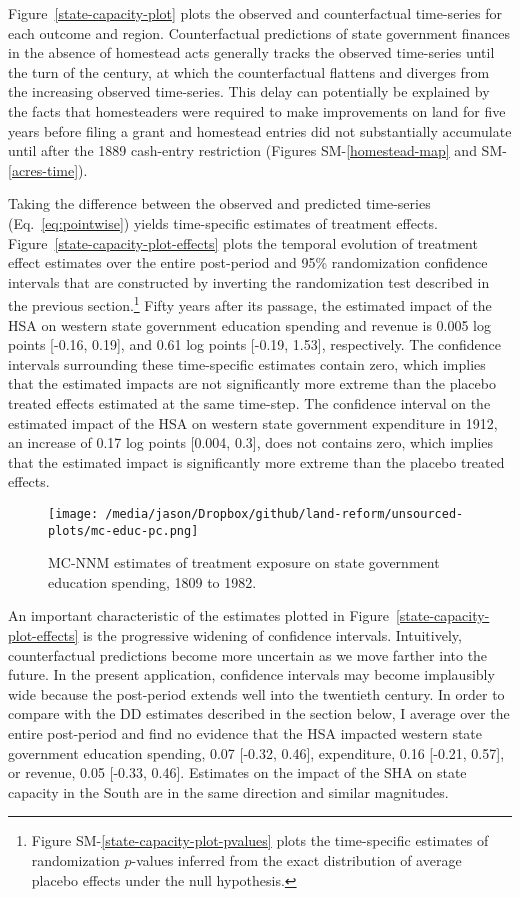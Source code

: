 \documentclass[hidelinks,12pt]{article}
\begin{document}
Figure~\ref{state-capacity-plot} plots the observed and counterfactual time-series for each outcome and region. Counterfactual predictions of state government finances in the absence of homestead acts generally tracks the observed time-series until the turn of the century, at which the counterfactual flattens and diverges from the increasing observed time-series. This delay can potentially be explained by the facts that homesteaders were required to make improvements on land for five years before filing a grant and homestead entries did not substantially accumulate until after the 1889 cash-entry restriction (Figures SM-\ref{homestead-map} and SM-\ref{acres-time}). 

Taking the difference between the observed and predicted time-series (Eq.~\ref{eq:pointwise}) yields time-specific estimates of treatment effects. Figure~\ref{state-capacity-plot-effects} plots the temporal evolution of treatment effect estimates over the entire post-period and 95\% randomization confidence intervals that are constructed by inverting the randomization test described in the previous section.\footnote{Figure SM-\ref{state-capacity-plot-pvalues} plots the time-specific estimates of randomization $p$-values inferred from the exact distribution of average placebo effects under the null hypothesis.} Fifty years after its passage, the estimated impact of the HSA on western state government education spending and revenue is 0.005 log points [-0.16, 0.19], and 0.61 log points [-0.19, 1.53], respectively. The confidence intervals surrounding these time-specific estimates contain zero, which implies that the estimated impacts are not significantly more extreme than the placebo treated effects estimated at the same time-step. The confidence interval on the estimated impact of the HSA on western state government expenditure in 1912, an increase of 0.17 log points [0.004, 0.3], does not contains zero, which implies that the estimated impact is significantly more extreme than the placebo treated effects. 

\begin{figure}[htbp]
	\centering
	\texttt{[image: /media/jason/Dropbox/github/land-reform/unsourced-plots/mc-educ-pc.png]}
	\caption{MC-NNM estimates of treatment exposure on state government education spending, 1809 to 1982.\label{mc-educ-pc}} 
\end{figure}

An important characteristic of the estimates plotted in Figure~\ref{state-capacity-plot-effects} is the progressive widening of confidence intervals. Intuitively, counterfactual predictions become more uncertain as we move farther into the future. In the present application, confidence intervals may become implausibly wide because the post-period extends well into the twentieth century. In order to compare with the DD estimates described in the section below, I average over the entire post-period and find no evidence that the HSA impacted western state government education spending, 0.07 [-0.32, 0.46], expenditure, 0.16 [-0.21, 0.57], or revenue, 0.05 [-0.33, 0.46]. Estimates on the impact of the SHA on state capacity in the South are in the same direction and similar magnitudes. 
\end{document}

